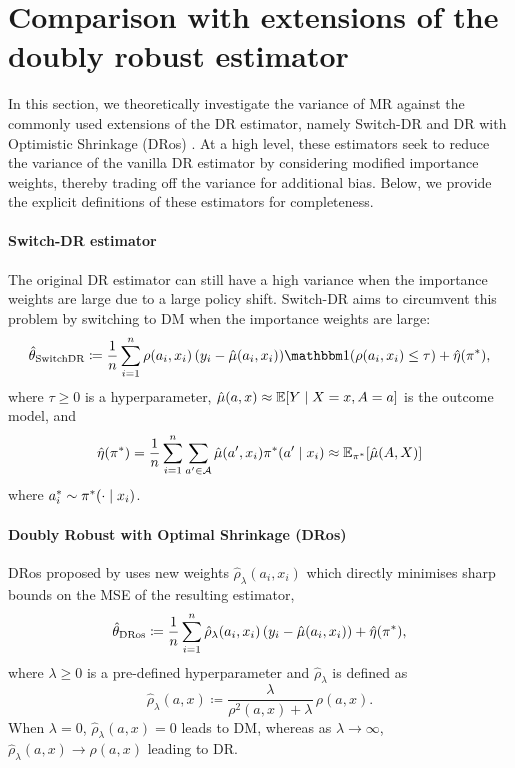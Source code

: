 \section{Comparison with extensions of the doubly robust estimator}\label{sec:dr-extensions}
In this section, we theoretically investigate the variance of MR against the commonly used extensions of the DR estimator, namely Switch-DR \citep{wang2017optimal} and DR with Optimistic Shrinkage (DRos) \citep{su2020doubly}. At a high level, these estimators seek to reduce the variance of the vanilla DR estimator by considering modified importance weights, thereby trading off the variance for additional bias.
Below, we provide the explicit definitions of these estimators for completeness.

\paragraph{Switch-DR estimator}
The original DR estimator can still have a high variance when the importance weights are large due to a large policy shift. Switch-DR \cite{wang2017optimal} aims to circumvent this problem by switching to DM when the importance weights are large:
\[
\thetaswitch \coloneqq \frac{1}{n} \sum_{i=1}^n \rho(a_i, x_i)\,(y_i - \hat{\mu}(a_i, x_i))\ind(\rho(a_i, x_i) \leq \tau) + \hat{\eta}(\tar),
\]
where $\tau \geq 0$ is a hyperparameter, $\hat{\mu}(a, x) \approx \mathbb{E}[Y \mid X=x, A=a]$ is the outcome model, and 
$$
\hat{\eta}(\pi^*) = \frac{1}{n} \sum_{i=1}^n \sum_{a'\in \mathcal{A}} \hat{\mu}(a', x_i) \pi^*(a'\mid x_i) \approx \mathbb{E}_{\pi^*}[\hat{\mu}(A, X)]
$$
where $a_i^* \sim \pi^*(\cdot \mid x_i)$.

\paragraph{Doubly Robust with Optimal Shrinkage (DRos)}
DRos proposed by \citep{su2020doubly} uses new weights $\hat{\rho}_\lambda(a_i, x_i)$ which directly minimises sharp bounds on the MSE of the resulting estimator,
\[
\hat{\theta}_{\textup{DRos}} \coloneqq \frac{1}{n} \sum_{i=1}^n \hat{\rho}_\lambda(a_i, x_i)\,(y_i - \hat{\mu}(a_i, x_i)) + \hat{\eta}(\pi^*),
\]
where $\lambda \geq 0$ is a pre-defined hyperparameter and $\hat{\rho}_\lambda$ is defined as
\[
\hat{\rho}_\lambda(a, x) \coloneqq \frac{\lambda}{\rho^2(a, x) + \lambda}\, \rho(a, x).
\]
When $\lambda = 0$, $\hat{\rho}_\lambda(a, x) = 0$ leads to DM, whereas as $\lambda \rightarrow \infty$, $\hat{\rho}_\lambda(a, x) \rightarrow \rho(a, x)$ leading to DR.

